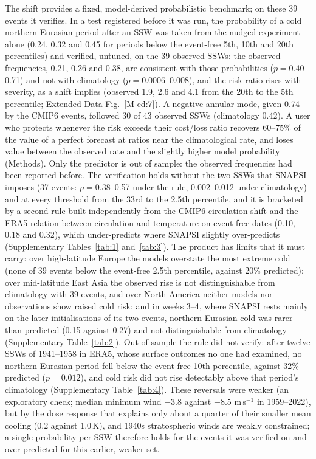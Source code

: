 \documentclass[11pt]{article}
\begin{document}
The shift provides a fixed, model-derived probabilistic benchmark; on these 39 events it verifies. In a test registered before it was run, the probability of a cold northern-Eurasian period after an SSW was taken from the nudged experiment alone (0.24, 0.32 and 0.45 for periods below the event-free 5th, 10th and 20th percentiles) and verified, untuned, on the 39 observed SSWs: the observed frequencies, 0.21, 0.26 and 0.38, are consistent with those probabilities ($p = 0.40$–0.71) and not with climatology ($p = 0.0006$–0.008), and the risk ratio rises with severity, as a shift implies (observed 1.9, 2.6 and 4.1 from the 20th to the 5th percentile; Extended Data Fig.~\ref{M-ed:7}). A negative annular mode, given 0.74 by the CMIP6 events, followed 30 of 43 observed SSWs (climatology 0.42). A user who protects whenever the risk exceeds their cost/loss ratio recovers 60–75\% of the value of a perfect forecast at ratios near the climatological rate, and loses value between the observed rate and the slightly higher model probability (Methods). Only the predictor is out of sample: the observed frequencies had been reported before. The verification holds without the two SSWs that SNAPSI imposes (37 events: $p = 0.38$–0.57 under the rule, 0.002–0.012 under climatology) and at every threshold from the 33rd to the 2.5th percentile, and it is bracketed by a second rule built independently from the CMIP6 circulation shift and the ERA5 relation between circulation and temperature on event-free dates (0.10, 0.18 and 0.32), which under-predicts where SNAPSI slightly over-predicts (Supplementary Tables~\ref{tab:1} and~\ref{tab:3}). The product has limits that it must carry: over high-latitude Europe the models overstate the most extreme cold (none of 39 events below the event-free 2.5th percentile, against 20\% predicted); over mid-latitude East Asia the observed rise is not distinguishable from climatology with 39 events, and over North America neither models nor observations show raised cold risk; and in weeks 3–4, where SNAPSI rests mainly on the later initialisations of its two events, northern-Eurasian cold was rarer than predicted (0.15 against 0.27) and not distinguishable from climatology (Supplementary Table~\ref{tab:2}). Out of sample the rule did not verify: after twelve SSWs of 1941–1958 in ERA5, whose surface outcomes no one had examined, no northern-Eurasian period fell below the event-free 10th percentile, against 32\% predicted ($p = 0.012$), and cold risk did not rise detectably above that period's climatology (Supplementary Table~\ref{tab:4}). These reversals were weaker (an exploratory check; median minimum wind $-3.8$ against $-8.5$ m\,s$^{-1}$ in 1959–2022), but by the dose response that explains only about a quarter of their smaller mean cooling (0.2 against 1.0\,K), and 1940s stratospheric winds are weakly constrained; a single probability per SSW therefore holds for the events it was verified on and over-predicted for this earlier, weaker set.
\end{document}
